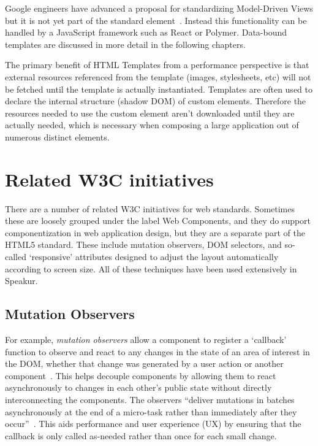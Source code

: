 Google engineers have advanced a proposal for standardizing 
Model-Driven Views
but it is not yet part of the standard  element~\cite{googledevelopers2014}.
Instead this functionality can be handled by a JavaScript framework such as React or Polymer.
Data-bound templates are discussed in more detail in the following chapters.

The primary benefit of HTML Templates from a performance perspective is that external resources referenced from the template (images, stylesheets, etc) will not be fetched until the template is actually instantiated.
Templates are often used to declare the internal structure (shadow DOM) of custom elements. 
Therefore the resources needed to use the custom element aren't downloaded until they are actually needed, which is necessary when composing a large application out of numerous distinct elements.


\section{Related W3C initiatives}
There are a number of related W3C initiatives for web standards. 
Sometimes these are loosely grouped under the label Web Components,
and they do support componentization in web application design, 
but they are a separate part of the HTML5 standard.
These include mutation observers, 
DOM selectors, 
and so-called `responsive' attributes designed to adjust the layout automatically according to screen size.
All of these techniques have been used extensively in Speakur.

\subsection{Mutation Observers}
\label{sec:bgmutation}
For example, \textit{mutation observers}
allow a component to register a `callback' function to observe and react to any changes in the state of an area of interest in the DOM, 
whether that change was generated by a user action or another 
component~\cite{w3ccontributors2014}.
This helps decouple components by allowing them to react asynchronously to changes in each other's public state without directly interconnecting the components.
The observers ``deliver mutations in batches asynchronously at the end of a micro-task rather than immediately after they occur''~\cite{addyosmani2014}.
This aids performance and user experience (UX) by ensuring that the callback is only called as-needed rather than once for each small change.

